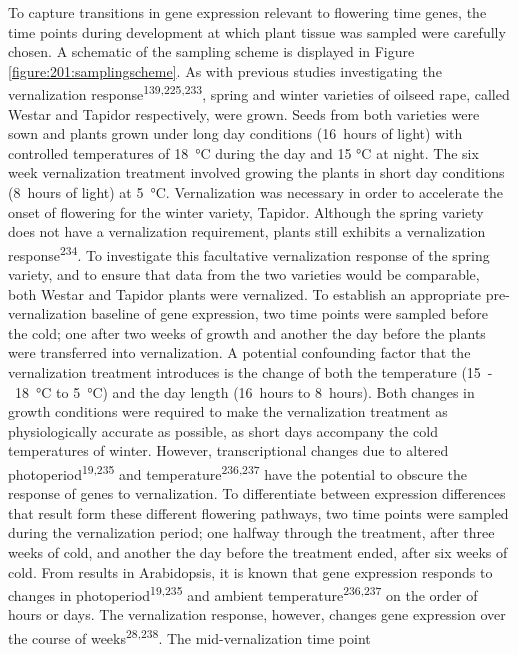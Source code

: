 \documentclass[12pt,]{book}
\begin{document}
To capture transitions in gene expression relevant to flowering time
genes, the time points during development at which plant tissue was
sampled were carefully chosen. A schematic of the sampling scheme is
displayed in Figure \ref{figure:201:samplingscheme}. As with previous
studies investigating the vernalization
response\textsuperscript{139,225,233}, spring and winter varieties of
oilseed rape, called Westar and Tapidor respectively, were grown. Seeds
from both varieties were sown and plants grown under long day conditions
(16~hours of light) with controlled temperatures of 18~°C during the day
and 15 °C at night. The six week vernalization treatment involved
growing the plants in short day conditions (8~hours of light) at 5~°C.
Vernalization was necessary in order to accelerate the onset of
flowering for the winter variety, Tapidor. Although the spring variety
does not have a vernalization requirement, plants still exhibits a
vernalization response\textsuperscript{234}. To investigate this
facultative vernalization response of the spring variety, and to ensure
that data from the two varieties would be comparable, both Westar and
Tapidor plants were vernalized. To establish an appropriate
pre-vernalization baseline of gene expression, two time points were
sampled before the cold; one after two weeks of growth and another the
day before the plants were transferred into vernalization. A potential
confounding factor that the vernalization treatment introduces is the
change of both the temperature (15~-~18~°C to 5~°C) and the day length
(16~hours to 8~hours). Both changes in growth conditions were required
to make the vernalization treatment as physiologically accurate as
possible, as short days accompany the cold temperatures of winter.
However, transcriptional changes due to altered
photoperiod\textsuperscript{19,235} and
temperature\textsuperscript{236,237} have the potential to obscure the
response of genes to vernalization. To differentiate between expression
differences that result form these different flowering pathways, two
time points were sampled during the vernalization period; one halfway
through the treatment, after three weeks of cold, and another the day
before the treatment ended, after six weeks of cold. From results in
Arabidopsis, it is known that gene expression responds to changes in
photoperiod\textsuperscript{19,235} and ambient
temperature\textsuperscript{236,237} on the order of hours or days. The
vernalization response, however, changes gene expression over the course
of weeks\textsuperscript{28,238}. The mid-vernalization time point
\end{document}

